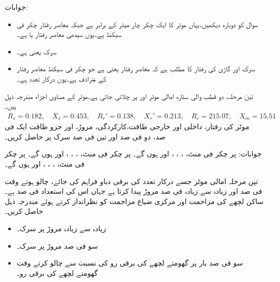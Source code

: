 جوابات:
\begin{itemize}
\item
سوال  کو دوبارہ دیکھیں۔یہاں موٹر کا ایک چکر چار میٹر کے برابر ہے جبکہ معاصر رفتار  چکر فی سیکنڈ ہے۔یوں سیدھی معاصر رفتار  یا  ہے۔ 
\item
سرک  یعنی  ہے۔
\item
سرک  اور گاڑی کی رفتار   کا مطلب ہے کہ معاصر رفتار  یعنی  ہے  جو   چکر فی سیکنڈ معاصر رفتار کے مترادف ہے۔یوں درکار تعدد  ہے۔
\end{itemize}
تین مرحلہ، دو قطب والی ستارہ  امالی موٹر  اور  پر چلائی جاتی ہے۔موٹر کے مساوی اجزاء مندرجہ ذیل ہیں۔
\begin{align*}
R_s=0.182, \quad X_s=0.453,\quad R_r'=0.138,\quad X_r'=0.213,\quad R_c=215.07,\quad X_m=15.51
\end{align*}
موٹر کی رفتار، داخلی اور خارجی طاقت،کارکردگی، مروڑ، اور جزو طاقت ایک فی صد، دو فی صد اور تین فی صد سرک پر حاصل کریں۔

جوابات: پر  چکر فی منٹ، ، ، ،  اور  ہوں گے۔ پر  چکر فی منٹ، ، ، ،  اور  ہوں گے۔ پر  چکر فی منٹ، ، ، ،  اور  ہوں گے۔


تین مرحلہ امالی موٹر  جسے درکار تعدد کی برقی دباو فراہم کی جائے، چالو ہوتے وقت  فی صد اور زیادہ سے زیادہ  فی صد مروڑ پیدا کرتا ہے جہاں اس کی استعداد  فی صد ہے۔ ساکن لچھے کی مزاحمت اور مرکزی ضیاع مزاحمت  کو نظرانداز کرتے ہوئے مندرجہ ذیل حاصل کریں۔
\begin{itemize}
\item
زیادہ سے زیادہ مروڑ پر سرک۔
\item
سو فی صد مروڑ پر سرک۔
\item
سو فی صد بار پر گھومتے لچھے کی برقی رو کی نسبت سے چالو کرتے وقت گھومتے لچھے کی برقی رو۔
\end{itemize}

